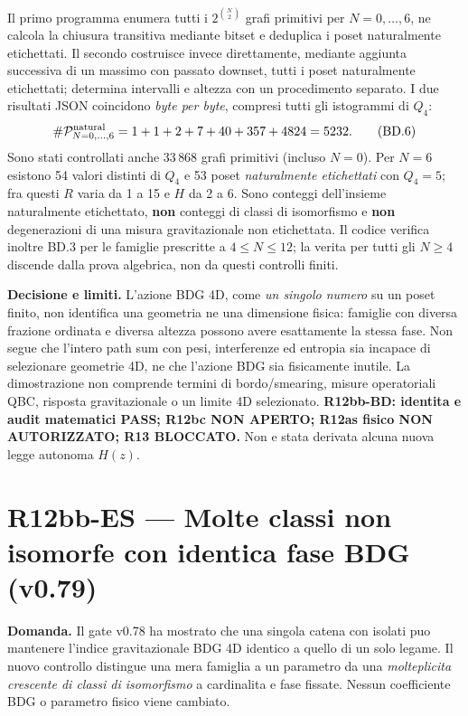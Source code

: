 \documentclass[11pt,a4paper]{article}
\begin{document}
Il primo programma enumera tutti i $2^{\binom N2}$ grafi primitivi per $N=0,\dots,6$, ne calcola la chiusura transitiva mediante bitset e deduplica i poset naturalmente etichettati. Il secondo costruisce invece direttamente, mediante aggiunta successiva di un massimo con passato downset, tutti i poset naturalmente etichettati; determina intervalli e altezza con un procedimento separato. I due risultati JSON coincidono \emph{byte per byte}, compresi tutti gli istogrammi di $Q_4$:
\begin{equation}
 \#\mathcal P^{\rm natural}_{N=0,\ldots,6}=1+1+2+7+40+357+4824=5232.
 \tag{BD.6}
\end{equation}
Sono stati controllati anche $33\,868$ grafi primitivi (incluso $N=0$). Per $N=6$ esistono 54 valori distinti di $Q_4$ e 53 poset \emph{naturalmente etichettati} con $Q_4=5$; fra questi $R$ varia da 1 a 15 e $H$ da 2 a 6. Sono conteggi dell'insieme naturalmente etichettato, \textbf{non} conteggi di classi di isomorfismo e \textbf{non} degenerazioni di una misura gravitazionale non etichettata. Il codice verifica inoltre BD.3 per le famiglie prescritte a $4\le N\le12$; la verita per tutti gli $N\ge4$ discende dalla prova algebrica, non da questi controlli finiti.

\textbf{Decisione e limiti.} L'azione BDG 4D, come \emph{un singolo numero} su un poset finito, non identifica una geometria ne una dimensione fisica: famiglie con diversa frazione ordinata e diversa altezza possono avere esattamente la stessa fase. Non segue che l'intero path sum con pesi, interferenze ed entropia sia incapace di selezionare geometrie 4D, ne che l'azione BDG sia fisicamente inutile. La dimostrazione non comprende termini di bordo/smearing, misure operatoriali QBC, risposta gravitazionale o un limite 4D selezionato. \textbf{R12bb-BD: identita e audit matematici PASS; R12bc NON APERTO; R12as fisico NON AUTORIZZATO; R13 BLOCCATO.} Non e stata derivata alcuna nuova legge autonoma $H(z)$.



\clearpage
\section*{R12bb-ES --- Molte classi non isomorfe con identica fase BDG (v0.79)}
\textbf{Domanda.} Il gate v0.78 ha mostrato che una singola catena con isolati puo mantenere l'indice gravitazionale BDG 4D identico a quello di un solo legame. Il nuovo controllo distingue una mera famiglia a un parametro da una \emph{molteplicita crescente di classi di isomorfismo} a cardinalita e fase fissate. Nessun coefficiente BDG o parametro fisico viene cambiato.
\end{document}
